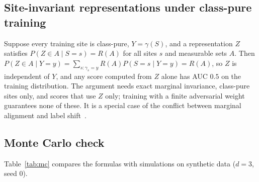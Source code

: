 \subsection{Site-invariant representations under class-pure training}

Suppose every training site is class-pure, $Y=\gamma(S)$, and a representation $Z$ satisfies $P(Z\in A\mid S=s)=R(A)$ for all sites $s$ and measurable sets $A$. Then $P(Z\in A\mid Y=y)=\sum_{s:\gamma_s=y}R(A)P(S=s\mid Y=y)=R(A)$, so $Z$ is independent of $Y$, and any score computed from $Z$ alone has AUC $0.5$ on the training distribution. The argument needs exact marginal invariance, class-pure sites only, and scores that use $Z$ only; training with a finite adversarial weight guarantees none of these. It is a special case of the conflict between marginal alignment and label shift~\cite{zhao2019}.

\subsection{Monte Carlo check}

Table~\ref{tab:mc} compares the formulas with simulations on synthetic data ($d=3$, seed $0$).

\begin{table}[h]
\centering
\caption{Monte Carlo check of the formal results on synthetic data.}
\label{tab:mc}
\small
{}
\end{table}

